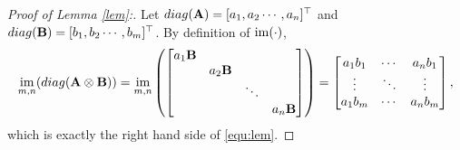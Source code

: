 \documentclass[10pt,a4paper]{amsart}
\newcommand{\diag}{{\rm{diag}}}
\DeclareMathOperator*{\im}{{\rm{im}}}
\newcommand{\mA}{\mathbf{A}}
\newcommand{\mB}{\mathbf{B}}
\begin{document}
\begin{proof}[Proof of Lemma \ref{lem}:]

Let $\diag(\mA) = [a_1,a_2 \cdots , a_n]^\top$ and $\diag(\mB) = [ b_1, b_2 \cdots , b_m]^\top$. 
By definition of $\im(\cdot)$, 
\begin{align*}
\im_{m, n}(\diag(\mA \otimes \mB)) = \im_{m, n}\left(
\begin{bmatrix}
a_1\mB\\
&a_2\mB\\
&&\ddots\\
&&&a_n\mB\end{bmatrix}\right)=
\begin{bmatrix}
a_1b_1 & \cdots & a_nb_1 \\
\vdots & \ddots & \vdots \\
a_1b_m & \cdots & a_nb_m
\end{bmatrix},
\end{align*}
which is exactly the right hand side of \eqref{equ:lem}. 
\end{proof}
\end{document}
